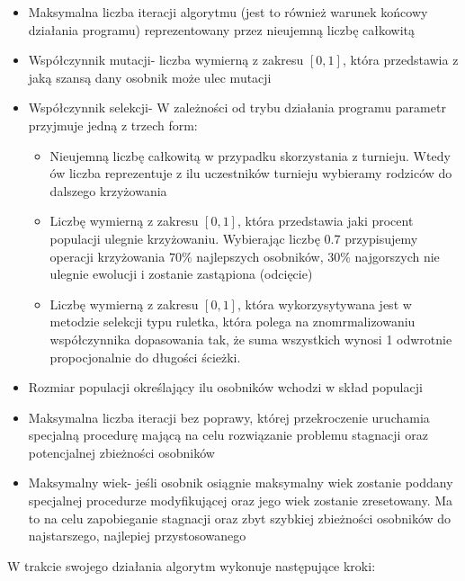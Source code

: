   \begin{itemize}
    \item Maksymalna liczba iteracji algorytmu (jest to również warunek końcowy działania programu) reprezentowany przez nieujemną liczbę całkowitą
    \item Współczynnik mutacji- liczba wymierną z zakresu $[0,1]$, która przedstawia z jaką szansą dany osobnik może ulec mutacji
    \item Współczynnik selekcji- W zależności od trybu działania programu parametr przyjmuje jedną z trzech form:
    \begin{itemize}
      \item Nieujemną liczbę całkowitą w przypadku skorzystania z turnieju. Wtedy ów liczba reprezentuje z ilu uczestników turnieju wybieramy rodziców do dalszego krzyżowania
      \item Liczbę wymierną z zakresu $[0,1]$, która przedstawia jaki procent populacji ulegnie krzyżowaniu. Wybierając liczbę 0.7 przypisujemy operacji krzyżowania $70\%$ najlepszych osobników, $30\%$ najgorszych nie ulegnie ewolucji i zostanie zastąpiona (odcięcie)
      \item Liczbę wymierną z zakresu $[0,1]$, która wykorzysytywana jest w metodzie selekcji typu ruletka, która polega na znomrmalizowaniu współczynnika dopasowania tak, że suma wszystkich wynosi 1 odwrotnie propocjonalnie do długości ścieżki.
    \end{itemize}
    \item Rozmiar populacji określający ilu osobników wchodzi w skład populacji
    \item Maksymalna liczba iteracji bez poprawy, której przekroczenie uruchamia specjalną procedurę mającą na celu rozwiązanie problemu stagnacji oraz potencjalnej zbieżności osobników
    \item Maksymalny wiek- jeśli osobnik osiągnie maksymalny wiek zostanie poddany specjalnej procedurze modyfikującej oraz jego wiek zostanie zresetowany. Ma to na celu zapobieganie stagnacji oraz zbyt szybkiej zbieżności osobników do najstarszego, najlepiej przystosowanego
  \end{itemize}
  W trakcie swojego działania algorytm wykonuje następujące kroki:
